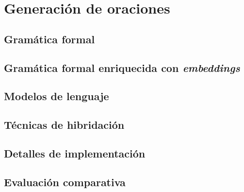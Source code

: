 \chapter{Generación de oraciones}
\label{ch:generacion-oraciones}


\section{Gramática formal}
\label{sec:gramatica-formal}


\section{Gramática formal enriquecida con \textit{embeddings}}
\label{sec:enfoque-hibrido}


\section{Modelos de lenguaje}
\label{sec:modelos-lenguaje}


\section{Técnicas de hibridación}
\label{sec:hibridacion}


\section{Detalles de implementación}
\label{sec:software}


\section{Evaluación comparativa}
\label{sec:evaluacion-comparativa}

